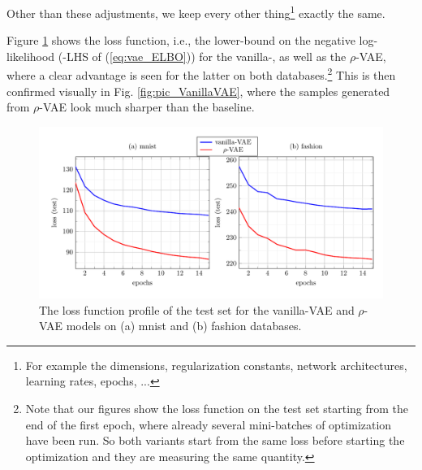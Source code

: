 \documentclass{article}
\begin{document}
Other than these adjustments, we keep every other thing\footnote{For example the dimensions, regularization constants, network architectures, learning rates, epochs, ...} exactly the same. 

Figure \ref{fig:curve_VanillaVAE} shows the loss function, i.e., the lower-bound on the negative log-likelihood (-LHS of (\ref{eq:vae_ELBO})) for the vanilla-, as well as the $\rho$-VAE, where a clear advantage is seen for the latter on both databases.\footnote{Note that our figures show the loss function on the test set starting from the end of the first epoch, where already several mini-batches of optimization have been run. So both variants start from the same loss before starting the optimization and they are measuring the same quantity.} This is then confirmed visually in Fig. \ref{fig:pic_VanillaVAE}, where the samples generated from $\rho$-VAE look much sharper than the baseline. 

 \begin{figure}  [!h]
   \begin{center} 
\includegraphics[width=1.0\textwidth]{figs/curves/VanillaVAE.pdf}

\end{center}
\vspace{-.75cm}    
   \caption{The loss function profile of the test set for the vanilla-VAE and $\rho$-VAE models on (a) mnist and (b) fashion databases.}
   \label{fig:curve_VanillaVAE}
   \end{figure}
\end{document}
